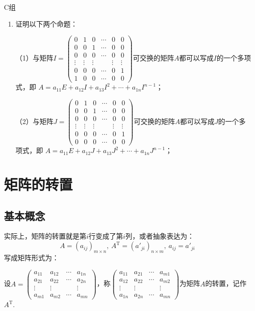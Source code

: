 \centerline{\heiti C组}
\begin{enumerate}
	\item 证明以下两个命题：
	
	（1）与矩阵$I=\begin{pmatrix}
		0 & 1 & 0 & \cdots & 0 & 0 \\
		0 & 0 & 1 & \cdots & 0 & 0 \\
		0 & 0 & 0 & \cdots & 0 & 0 \\
		\vdots & \vdots & \vdots &  & \vdots & \vdots \\
		0 & 0 & 0 & \cdots & 0 & 1 \\
		1 & 0 & 0 & \cdots & 0 & 0
	\end{pmatrix}$可交换的矩阵$A$都可以写成$I$的一个多项式，即
	$A=a_{11}E+a_{12}I+a_{13}I^2+\cdots+a_{1n}I^{n-1}$；
	
	（2）与矩阵$J=\begin{pmatrix}
		0 & 1 & 0 & \cdots & 0 & 0 \\
		0 & 0 & 1 & \cdots & 0 & 0 \\
		0 & 0 & 0 & \cdots & 0 & 0 \\
		\vdots & \vdots & \vdots &  & \vdots & \vdots \\
		0 & 0 & 0 & \cdots & 0 & 1 \\
		0 & 0 & 0 & \cdots & 0 & 0
	\end{pmatrix}$可交换的矩阵$A$都可以写成$J$的一个多项式，即
	$A=a_{11}E+a_{12}J+a_{13}J^2+\cdots+a_{1n}J^{n-1}$；
\end{enumerate}

\section{矩阵的转置}
\subsection{基本概念}
实际上，矩阵的转置就是第$i$行变成了第$i$列，或者抽象表达为：
$$A=(a_{ij})_{m \times n},\ A^\mathrm{T}=(a'_{ji})_{n \times m},\ a_{ij}=a'_{ji}$$
写成矩阵形式为：
\begin{definition}
	设$A=\begin{pmatrix}
		a_{11} & a_{12} & \cdots & a_{1n} \\
		a_{21} & a_{22} & \cdots & a_{2n} \\
		\vdots & \vdots &       & \vdots \\
		a_{m1} & a_{m2} & \cdots & a_{mn}
	\end{pmatrix}$，称$\begin{pmatrix}
		a_{11} & a_{21} & \cdots & a_{m1} \\
		a_{12} & a_{22} & \cdots & a_{m2} \\
		\vdots & \vdots &       & \vdots \\
		a_{1n} & a_{2n} & \cdots & a_{mn}
	\end{pmatrix}$为矩阵$A$的转置，记作$A^\mathrm{T}$.
\end{definition}

